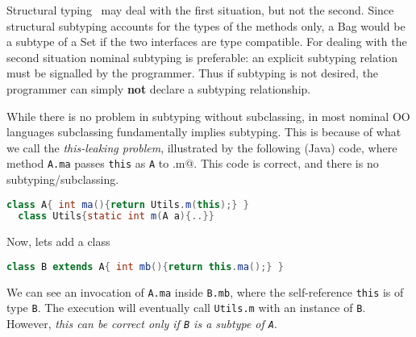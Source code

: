 \noindent Structural typing~\cite{cook} may deal with the first
situation, but not the second. Since structural subtyping
accounts for the types of the methods only, a Bag would be a subtype
of a Set if the two interfaces are type compatible. For dealing with
the second situation nominal subtyping is preferable: an explicit subtyping relation must be signalled by the programmer. Thus if subtyping is not desired, the
programmer can simply {\bf not} declare a subtyping relationship.

While there is no problem in subtyping without subclassing, in most nominal OO languages subclassing fundamentally implies subtyping. 
This is because of what we call the
\emph{this-leaking problem}, illustrated by the following
(Java) code, where
method \lstinline{A.ma} passes \lstinline{this} as \lstinline{A} to \Q@Utils.m@.
This code is correct, and there is no subtyping/subclassing{.}\saveSpace\saveSpace
\begin{lstlisting}[language=Java]
  class A{ int ma(){return Utils.m(this);} }
  class Utils{static int m(A a){..}}
\end{lstlisting}
\saveSpace\saveSpace
  Now, lets add a class \Q@B@
\saveSpace\saveSpace\saveSpace
\begin{lstlisting}[language=Java]
  class B extends A{ int mb(){return this.ma();} }  
\end{lstlisting}
\saveSpace\saveSpace
\noindent We can see an invocation of \lstinline{A.ma} inside
\lstinline{B.mb}, where the self-reference \lstinline{this} is of type \lstinline{B}. 
The execution will eventually call \lstinline{Utils.m} with an
instance of \lstinline{B}. However, \emph{this can be correct only if \lstinline{B} is a subtype of
\lstinline{A}}. 

%
%


